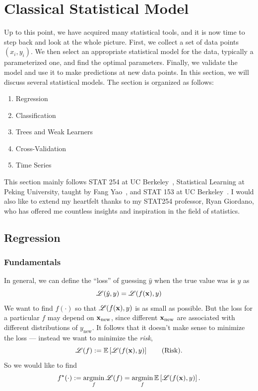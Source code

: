 \newpage
\section{Classical Statistical Model}
Up to this point, we have acquired many statistical tools, and it is now time to step back and look at the whole picture. First, we collect a set of data points $(x_i, y_i)$. We then select an appropriate statistical model for the data, typically a parameterized one, and find the optimal parameters. Finally, we validate the model and use it to make predictions at new data points. In this section, we will discuss several statistical models. The section is organized as follows:
\begin{enumerate}
    \item Regression
    \item Classification
    \item Trees and Weak Learners
    \item Cross-Validation
    \item Time Series
\end{enumerate}

This section mainly follows STAT 254 at UC Berkeley~\cite{giordanoBerkeleyStat254}, Statistical Learning at Peking University, taught by Fang Yao~\cite{yaoPkuStatisticalLearning}, and STAT 153 at UC Berkeley~\cite{hamilton2026stat153}.
I would also like to extend my heartfelt thanks to my STAT254 professor, Ryan Giordano, who has offered me countless insights and inspiration in the field of statistics.


\subsection{Regression}

\subsubsection{Fundamentals}
In general, we can define the ``loss'' of guessing $\hat{y}$ when the true value was is $y$ as
\[
\mathscr{L}(\hat{y}, y) = \mathscr{L}(f(\mathbf{x}), y)
\]
We want to find $f(\cdot)$ so that $\mathscr{L}(f(\mathbf{x}), y)$ is as small as possible. But the loss for a particular $f$ may depend on $\mathbf{x}_{\mathrm{new}}$, since different $\mathbf{x}_{\mathrm{new}}$ are associated with different distributions of $y_{\mathrm{new}}$. It follows that it doesn't make sense to minimize the loss --- instead we want to minimize the \emph{risk},
\[
\mathscr{L}(f) := \mathbb{E}\left[\mathscr{L}(f(\mathbf{x}), y)\right] \qquad \text{(Risk)}.
\]
So we would like to find
\[
f^{\star}(\cdot) := \operatorname*{argmin}_{f} \mathscr{L}(f) = \operatorname*{argmin}_{f} \mathbb{E}\left[\mathscr{L}(f(\mathbf{x}), y)\right].
\]

